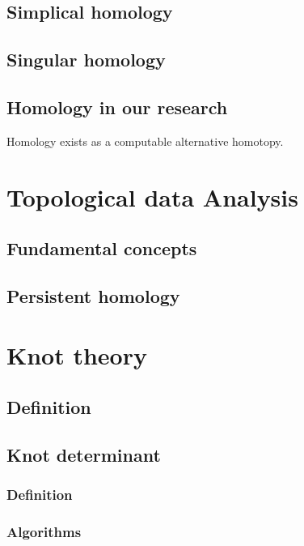 \documentclass[12pt]{article}
\begin{document}
\subsection{Simplical homology}

\subsection{Singular homology}

\subsection{Homology in our research}

Homology exists as a computable alternative homotopy.

\section{Topological data Analysis}

\subsection{Fundamental concepts}

\subsection{Persistent homology}

\section{Knot theory}

\subsection{Definition}

\subsection{Knot determinant}

\subsubsection{Definition}

\subsubsection{Algorithms}
\end{document}
